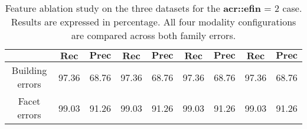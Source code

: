 \begin{table}[htbp]
\begin{tabular}{|c | c c | c c | c c | c c |}
                \cline{2-9}
                & $\bm{Rec}$ & $\bm{Prec}$ &  $\bm{Rec}$ & $\bm{Prec}$ &  $\bm{Rec}$ & $\bm{Prec}$ &  $\bm{Rec}$ & $\bm{Prec}$ \\
                \hline
                Building errors & 97.36 & 68.76 & 97.36 & 68.76 & 97.36 & 68.76 & 97.36 & 68.76 \\
                \hline
                Facet errors & 99.03 & 91.26 & 99.03 & 91.26 & 99.03 & 91.26 & 99.03 & 91.26 \\
                \hline
            \end{tabular}
            \caption{
                \label{tab::ablation_f2}
                Feature ablation study on the three datasets for the \textbf{\gls{acr::efin}} = 2 case.
                Results are expressed in percentage.
                All four modality configurations are compared across both family errors.
            }
        \end{table}
    
        \begin{figure}[htbp]
        \end{figure}
    

